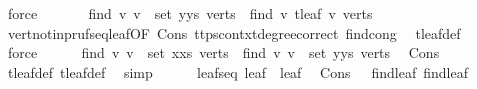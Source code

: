 \begin{isabellebody}
\ force\isanewline
\ \ \ \ \isamarkupfalse%
\ {}{\isacharcolon}{\kern0pt}\ {\isachardoublequoteopen}find\ {\isacharparenleft}{\kern0pt}{\isasymlambda}v{\isachardot}{\kern0pt}\ v\ {\isasymnotin}\ set\ {\isacharparenleft}{\kern0pt}y{\isacharhash}{\kern0pt}ys{\isacharparenright}{\kern0pt}{\isacharparenright}{\kern0pt}\ verts\ {\isacharequal}{\kern0pt}\ find\ {\isacharparenleft}{\kern0pt}{\isasymlambda}v{\isachardot}{\kern0pt}\ t{}{\isachardot}{\kern0pt}leaf\ v{\isacharparenright}{\kern0pt}\ verts{\isachardoublequoteclose}\ \isamarkupfalse%
\ vert{\isacharunderscore}{\kern0pt}notin{\isacharunderscore}{\kern0pt}pruf{\isacharunderscore}{\kern0pt}seq{\isacharunderscore}{\kern0pt}leaf{\isacharbrackleft}{\kern0pt}OF\ Cons{\isacharparenleft}{\kern0pt}{}{\isacharparenright}{\kern0pt}{\isacharbrackright}{\kern0pt}\ ttps{\isacharunderscore}{\kern0pt}contxt{}{\isachardot}{\kern0pt}degree{\isacharunderscore}{\kern0pt}correct\ find{\isacharunderscore}{\kern0pt}cong\ \isamarkupfalse%
\ t{}{\isachardot}{\kern0pt}leaf{\isacharunderscore}{\kern0pt}def\ \isamarkupfalse%
\ force\isanewline
\ \ \ \ \isamarkupfalse%
\ {\isachardoublequoteopen}find\ {\isacharparenleft}{\kern0pt}{\isasymlambda}v{\isachardot}{\kern0pt}\ v\ {\isasymnotin}\ set\ {\isacharparenleft}{\kern0pt}x{\isacharhash}{\kern0pt}xs{\isacharparenright}{\kern0pt}{\isacharparenright}{\kern0pt}\ verts\ {\isacharequal}{\kern0pt}\ find\ {\isacharparenleft}{\kern0pt}{\isasymlambda}v{\isachardot}{\kern0pt}\ v\ {\isasymnotin}\ set\ {\isacharparenleft}{\kern0pt}y{\isacharhash}{\kern0pt}ys{\isacharparenright}{\kern0pt}{\isacharparenright}{\kern0pt}\ verts{\isachardoublequoteclose}\ \isamarkupfalse%
\ Cons{\isacharparenleft}{\kern0pt}{}{\isacharparenright}{\kern0pt}\ {}\ {}\ \isamarkupfalse%
\ t{}{\isachardot}{\kern0pt}leaf{\isacharunderscore}{\kern0pt}def\ t{}{\isachardot}{\kern0pt}leaf{\isacharunderscore}{\kern0pt}def\ \isamarkupfalse%
\ simp\isanewline
\ \ \ \ \isamarkupfalse%
\ leafs{\isacharunderscore}{\kern0pt}eq{\isacharcolon}{\kern0pt}\ {\isachardoublequoteopen}leaf{}\ {\isacharequal}{\kern0pt}\ leaf{\isachardoublequoteclose}\ \isamarkupfalse%
\ Cons{\isacharparenleft}{\kern0pt}{}{\isacharparenright}{\kern0pt}\ {}\ {}\ find{\isacharunderscore}{\kern0pt}leaf\ find{\isacharunderscore}{\kern0pt}leaf{}\ \isamarkupfalse%

\end{isabellebody}
